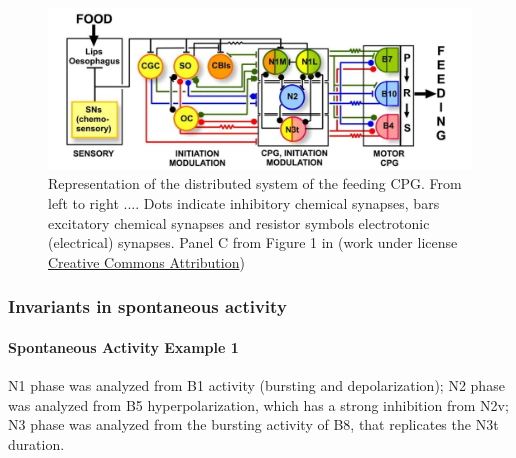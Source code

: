 \begin{figure}[bth!]
	\centering
	\includegraphics[width=\textwidth]{img/invariants/distributed_benjamin_2012.pdf}
	\caption{Representation of the distributed system of the feeding CPG. From left to right .... Dots indicate inhibitory chemical synapses, bars excitatory chemical synapses and resistor symbols electrotonic (electrical) synapses. Panel C from Figure 1 in \cite{benjamin_distributed_2012} (work under license \href{http://creativecommons.org/licenses/by/2.0}{Creative Commons Attribution})}
	\label{fig:feeding distribution}
\end{figure}






\subsubsection{Invariants in spontaneous activity}

\paragraph{Spontaneous Activity Example 1}
N1 phase was analyzed from B1 activity (bursting and depolarization); N2 phase was analyzed from B5 hyperpolarization, which has a strong inhibition from N2v; N3 phase was analyzed from the bursting activity of B8, that replicates the N3t duration. 

